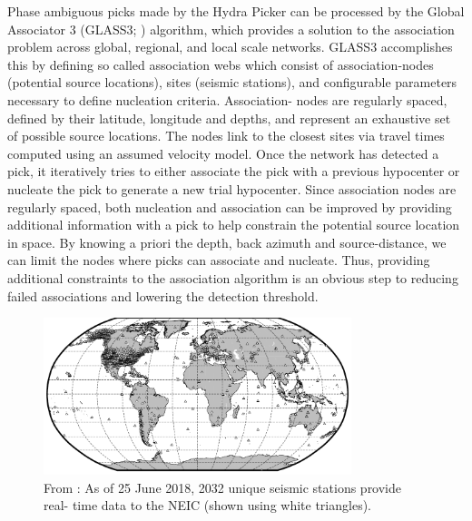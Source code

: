 \documentclass[12p]{article}
\begin{document}
Phase ambiguous picks made by the Hydra Picker can be processed by the Global Associator 3 (GLASS3; \citet{Yeck2019})
algorithm, which provides a solution to the association problem across global, regional, and local scale networks.
GLASS3 accomplishes this by defining so called association webs which consist of association-nodes (potential source
locations), sites (seismic stations), and configurable parameters necessary to define nucleation criteria. Association-
nodes are regularly spaced, defined by their latitude, longitude and depths, and represent an exhaustive set of
possible source locations. The nodes link to the closest sites via travel times computed using an assumed velocity
model. Once the network has detected a pick, it iteratively tries to either associate the pick with a previous
hypocenter or nucleate the pick to generate a new trial hypocenter. Since association nodes are regularly spaced, both
nucleation and association can be improved by providing additional information with a pick to help constrain the
potential source location in space. By knowing a priori the depth, back azimuth and source-distance, we can limit the
nodes where picks can associate and nucleate. Thus, providing additional constraints to the association algorithm is an
obvious step to reducing failed associations and lowering the detection threshold.

\begin{figure}[!htb]
  \center\includegraphics[width=0.8\textwidth]{figures/global_station_coverage.png}
  \caption{\label{fig:stations} From \cite{Yeck2019}: As of 25 June 2018, 2032 unique seismic stations provide real-
  time data to the NEIC (shown using white triangles).}
\end{figure}
\end{document}
